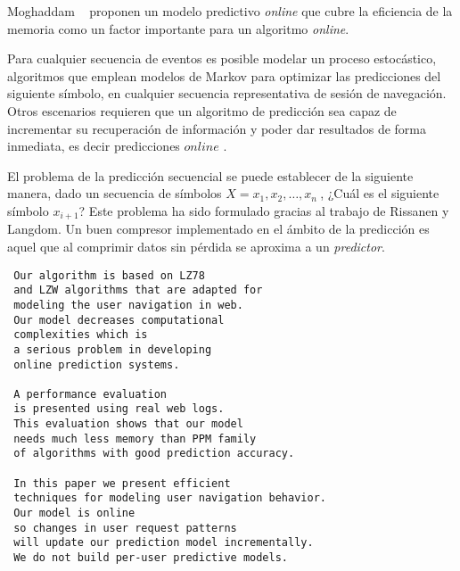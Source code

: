 Moghaddam \etal~\cite{Moghaddam2009} proponen un modelo predictivo \emph{online} que cubre la eficiencia de la memoria como un factor importante para un algoritmo \emph{online}. 

Para cualquier secuencia de eventos es posible modelar un proceso estocástico, algoritmos que emplean modelos de Markov para optimizar las predicciones del siguiente símbolo, en cualquier secuencia representativa  de sesión de navegación. Otros escenarios requieren que un algoritmo de predicción sea capaz de incrementar su recuperación de información  y poder dar resultados de forma inmediata, es decir predicciones $online$ .

El problema de la predicción secuencial se puede establecer de la siguiente manera, dado un secuencia de símbolos $ X = x_{1}, x_{2}, \dots, x_{n}\ $, ¿Cuál es el siguiente símbolo $x_{i+1}$? Este problema ha sido formulado gracias al trabajo de  Rissanen\cite{Rissanen1983} y Langdom\cite{Langdon1983}. Un buen compresor implementado en el ámbito de la predicción es aquel que al comprimir datos sin pérdida se aproxima a un \emph{predictor}.





\begin{verbatim}
 Our algorithm is based on LZ78 
 and LZW algorithms that are adapted for 
 modeling the user navigation in web. 
 Our model decreases computational 
 complexities which is 
 a serious problem in developing 
 online prediction systems. 

 A performance evaluation 
 is presented using real web logs. 
 This evaluation shows that our model 
 needs much less memory than PPM family 
 of algorithms with good prediction accuracy.
 
 In this paper we present efficient 
 techniques for modeling user navigation behavior. 
 Our model is online 
 so changes in user request patterns 
 will update our prediction model incrementally. 
 We do not build per-user predictive models. 
\end{verbatim}
\LDCMoghaddam









